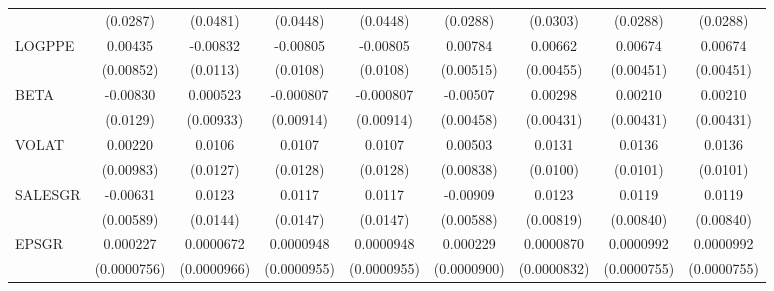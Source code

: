 \begin{table}[htbp]
\begin{tabular}{l*{8}{c}}
                    &    (0.0287)         &    (0.0481)         &    (0.0448)         &    (0.0448)         &    (0.0288)         &    (0.0303)         &    (0.0288)         &    (0.0288)         \\
LOGPPE              &     0.00435         &    -0.00832         &    -0.00805         &    -0.00805         &     0.00784         &     0.00662         &     0.00674         &     0.00674         \\
                    &   (0.00852)         &    (0.0113)         &    (0.0108)         &    (0.0108)         &   (0.00515)         &   (0.00455)         &   (0.00451)         &   (0.00451)         \\
BETA                &    -0.00830         &    0.000523         &   -0.000807         &   -0.000807         &    -0.00507         &     0.00298         &     0.00210         &     0.00210         \\
                    &    (0.0129)         &   (0.00933)         &   (0.00914)         &   (0.00914)         &   (0.00458)         &   (0.00431)         &   (0.00431)         &   (0.00431)         \\
VOLAT               &     0.00220         &      0.0106         &      0.0107         &      0.0107         &     0.00503         &      0.0131         &      0.0136         &      0.0136         \\
                    &   (0.00983)         &    (0.0127)         &    (0.0128)         &    (0.0128)         &   (0.00838)         &    (0.0100)         &    (0.0101)         &    (0.0101)         \\
SALESGR             &    -0.00631         &      0.0123         &      0.0117         &      0.0117         &    -0.00909         &      0.0123         &      0.0119         &      0.0119         \\
                    &   (0.00589)         &    (0.0144)         &    (0.0147)         &    (0.0147)         &   (0.00588)         &   (0.00819)         &   (0.00840)         &   (0.00840)         \\
EPSGR               &    0.000227\sym{***}&   0.0000672         &   0.0000948         &   0.0000948         &    0.000229\sym{**} &   0.0000870         &   0.0000992         &   0.0000992         \\
                    & (0.0000756)         & (0.0000966)         & (0.0000955)         & (0.0000955)         & (0.0000900)         & (0.0000832)         & (0.0000755)         & (0.0000755)         \\

\end{tabular}
\end{table}
